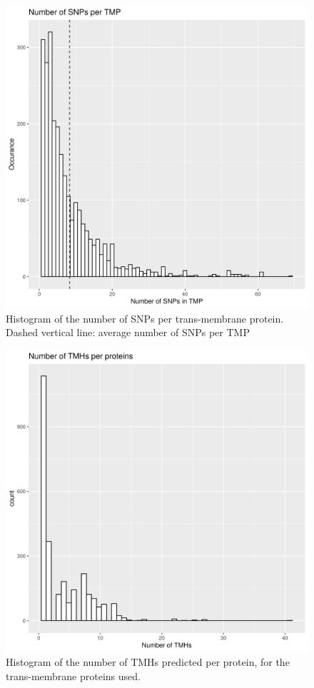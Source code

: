 \begin{figure}[!htbp]
  \includegraphics[width=\textwidth]{ncbi_peregrine_results/fig_n_snps_per_tmp.png}
  \caption{
    Histogram of the number of SNPs per trans-membrane protein.
    Dashed vertical line: average number of SNPs per TMP
  }
  \label{fig:n_tmhs_per_protein}
\end{figure}

\begin{figure}[!htbp]
  \includegraphics[width=\textwidth]{ncbi_peregrine_results/fig_n_tmhs_per_protein.png}
  \caption{
    Histogram of the number of TMHs predicted per protein,
    for the trans-membrane proteins used.
  }
  \label{fig:n_tmhs_per_protein}
\end{figure}

